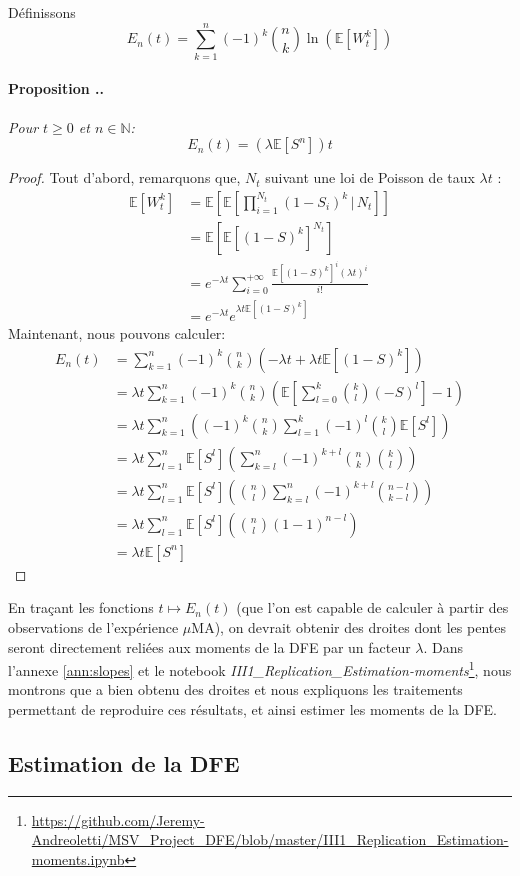 \documentclass[12pt]{article}
\newcounter{prop}[section]
\newcommand{\prop}[1]{\stepcounter{prop}\paragraph{Proposition \arabic{section}.\arabic{prop}.}\textit{\newline #1}\vspace{0.1cm}}
\newcommand{\pth}[1]{\left(#1\right)}
\newcommand{\cro}[1]{\left[#1\right]}
\newcommand{\En}{\mathbb{N}}
\newcommand{\Esp}[1]{\mathbb{E}\cro{#1}}
\newcommand{\kt }{\,|\,}
\begin{document}
Définissons \[E_n(t)=\sum_{k=1}^n(-1)^k\binom{n}{k}\ln\pth{\Esp{W_t^k}}\]

\prop{Pour $t\geqslant 0$ et $n\in\En$: \[E_n(t)=\pth{\lambda\Esp{S^n}}t\]}


\begin{proof}
  Tout d'abord, remarquons que, $N_t$ suivant une loi de Poisson de taux $\lambda t$ :
  \begin{align*}
    \Esp{W_t^k}&=\Esp{\Esp{\prod_{i=1}^{N_t}(1-S_i)^k\kt N_t}}\\
    &=\Esp{\Esp{(1-S)^k}^{N_t}}\\
    &=e^{-\lambda t}\sum_{i=0}^{+\infty}\frac{\Esp{(1-S)^k}^i(\lambda t)^i}{i!}\\
    &=e^{-\lambda t}e^{\lambda t\Esp{(1-S)^k}}
  \end{align*}
  Maintenant, nous pouvons calculer:
  \begin{align*}
    E_n(t)&=\sum_{k=1}^n(-1)^k\binom{n}{k}\pth{-\lambda t+\lambda t\Esp{(1-S)^k}}\\
    &=\lambda t\sum_{k=1}^n(-1)^k\binom{n}{k}\pth{\Esp{\sum_{l=0}^k\binom{k}{l}\pth{-S}^l}-1}\\
    &=\lambda t\sum_{k=1}^n\pth{(-1)^k\binom{n}{k}\sum_{l=1}^k(-1)^l\binom{k}{l}\Esp{S^l}}\\
    &=\lambda t\sum_{l=1}^n\Esp{S^l}\pth{\sum_{k=l}^n(-1)^{k+l}\binom{n}{k}\binom{k}{l}}\\
    &=\lambda t\sum_{l=1}^n\Esp{S^l}\pth{\binom{n}{l}\sum_{k=l}^n(-1)^{k+l}\binom{n-l}{k-l}}\\
    &=\lambda t\sum_{l=1}^n\Esp{S^l}\pth{\binom{n}{l}(1-1)^{n-l}}\\
    &=\lambda t\Esp{S^n}
  \end{align*}
\end{proof}

En traçant les fonctions $t\mapsto E_n(t)$ (que l'on est capable de calculer à partir des observations de l'expérience $\mu$MA), on devrait obtenir des droites dont les pentes seront directement reliées aux moments de la DFE par un facteur $\lambda$. Dans l'annexe \ref{ann:slopes} et le notebook \emph{III1\_Replication\_Estimation-moments}\footnote{\url{https://github.com/Jeremy-Andreoletti/MSV_Project_DFE/blob/master/III1_Replication_Estimation-moments.ipynb}}, nous montrons que \cite{rob} a bien obtenu des droites et nous expliquons les traitements permettant de reproduire ces résultats, et ainsi estimer les moments de la DFE.


\subsection{Estimation de la DFE}
\end{document}
